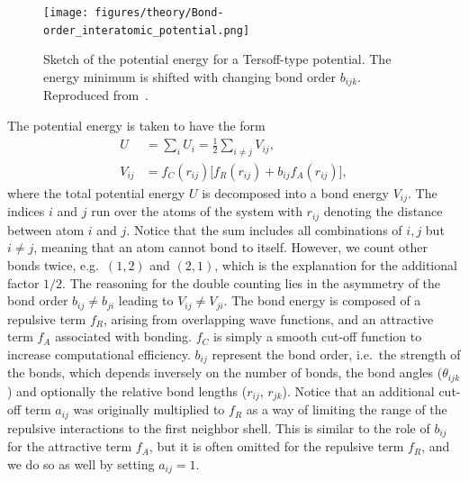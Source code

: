 \begin{figure}[!htb]
  \centering
  \texttt{[image: figures/theory/Bond-order\_interatomic\_potential.png]}
  \caption{Sketch of the potential energy for a Tersoff-type potential. The energy minimum is shifted with changing bond order $b_{ijk}$. Reproduced from~\cite{wiki:bond_order}.}
  \label{fig:bond_order}
\end{figure}


The potential energy is taken to have the form
\begin{align*}
  U &= \sum_i U_i = \frac{1}{2}\sum_{i \ne j} V_{ij}, \\
  V_{ij} &= f_C(r_{ij}) \big[f_R(r_{ij}) + b_{ij}f_A(r_{ij})  \big],
\end{align*}
where the total potential energy $U$ is decomposed into a bond energy $V_{ij}$.
The indices $i$ and $j$ run over the atoms of the system with $r_{ij}$ denoting
the distance between atom $i$ and $j$. Notice that the sum includes all
combinations of $i,j$ but $i\ne j$, meaning that an atom cannot bond to itself.
However, we count other bonds twice, e.g.\ $(1,2)$ and $(2,1)$, which is the
explanation for the additional factor $1/2$. The reasoning for the double
counting lies in the asymmetry of the bond order $b_{ij}\ne b_{ji}$ leading to
$V_{ij}\ne V_{ji}$. The bond energy is composed of a repulsive term $f_R$,
arising from overlapping wave functions, and an attractive term $f_A$ associated
with bonding. $f_C$ is simply a smooth cut-off function to increase
computational efficiency. $b_{ij}$ represent the bond order, i.e.\ the strength
of the bonds, which depends inversely on the number of bonds, the bond angles
($\theta_{ijk}$) and optionally the relative bond lengths ($r_{ij}$, $r_{jk}$).
Notice that an additional cut-off term $a_{ij}$ was originally multiplied to
$f_R$ as a way of limiting the range of the repulsive interactions to
the first neighbor shell. This is similar to the role of $b_{ij}$ for the attractive term $f_A$, but it is often omitted for the repulsive
term $f_R$, and we do so as well by setting $a_{ij} = 1$. 

